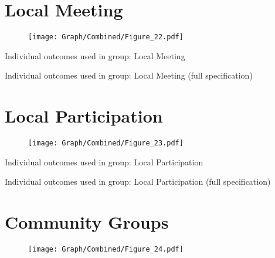 \documentclass[10pt,a4paper]{article}
\begin{document}
\section{Local Meeting}
\begin{table}[H]\centering

\end{table}
\begin{figure}[H]\centering
\texttt{[image: Graph/Combined/Figure\_22.pdf]}
\caption{} \label{fig:Fig_22}
\end{figure}

\begin{table}[H]\centering\caption{Individual outcomes used in group: Local Meeting }
\resizebox{\textwidth}{!}{}
\end{table}
\begin{table}[H]\centering\caption{Individual outcomes used in group: Local Meeting (full specification)}
\resizebox{\textwidth}{!}{}
\end{table}
\pagebreak
\section{Local Participation}
\begin{table}[H]\centering

\end{table}
\begin{figure}[H]\centering
\texttt{[image: Graph/Combined/Figure\_23.pdf]}
\caption{} \label{fig:Fig_23}
\end{figure}

\begin{table}[H]\centering\caption{Individual outcomes used in group: Local Participation }
\resizebox{\textwidth}{!}{}
\end{table}
\begin{table}[H]\centering\caption{Individual outcomes used in group: Local Participation (full specification)}
\resizebox{\textwidth}{!}{}
\end{table}
\pagebreak
\section{Community Groups}
\begin{table}[H]\centering

\end{table}
\begin{figure}[H]\centering
\texttt{[image: Graph/Combined/Figure\_24.pdf]}
\caption{} \label{fig:Fig_24}
\end{figure}
\end{document}
